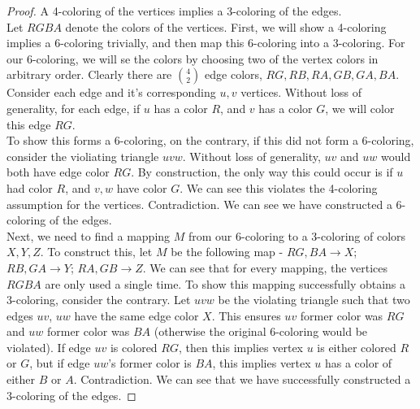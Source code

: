 \documentclass[a4paper]{article}
\begin{document}
\begin{proof} A 4-coloring of the vertices implies a 3-coloring of the edges. \\

    Let $RGBA$ denote the colors of the vertices. First, we will show a 4-coloring implies a 6-coloring trivially, and then map this 6-coloring into a 3-coloring. For our 6-coloring, we will se the colors by choosing two of the vertex colors in arbitrary order. Clearly there are $4\choose2$ edge colors, $RG, RB, RA, GB, GA, BA$. Consider each edge and it's corresponding $u, v$ vertices. Without loss of generality, for each edge, if $u$ has a color $R$, and $v$ has a color $G$, we will color this edge $RG$. \\

    To show this forms a 6-coloring, on the contrary, if this did not form a 6-coloring, consider the violiating triangle $uvw$. Without loss of generality, $uv$ and $uw$ would both have edge color $RG$. By construction, the only way this could occur is if $u$ had color $R$, and $v, w$ have color $G$. We can see this violates the 4-coloring assumption for the vertices. Contradiction. We can see we have constructed a 6-coloring of the edges. \\

    Next, we need to find a mapping $M$ from our 6-coloring to a 3-coloring of colors $X, Y, Z$. To construct this, let $M$ be the following map - $RG, BA \rightarrow X$; $RB, GA \rightarrow Y$; $RA, GB \rightarrow Z$. We can see that for every mapping, the vertices $RGBA$ are only used a single time. To show this mapping successfully obtains a 3-coloring, consider the contrary. Let $uvw$ be the violating triangle such that two edges $uv$, $uw$ have the same edge color $X$. This ensures $uv$ former color was $RG$ and $uw$ former color was $BA$ (otherwise the original 6-coloring would be violated). If edge $uv$ is colored $RG$, then this implies vertex $u$ is either colored $R$ or $G$, but if edge $uw$'s former color is $BA$, this implies vertex $u$ has a color of either $B$ or $A$. Contradiction. We can see that we have successfully constructed a 3-coloring of the edges.

\end{proof}
\end{document}

